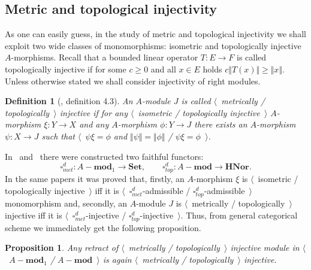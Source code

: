 \documentclass[12pt]{article}
\newtheorem{proposition}[theorem]{Proposition}
\newtheorem{definition}[theorem]{Definition}
\begin{document}

\subsection{Metric and topological
    injectivity}\label{SubSectionMetricAndTopologicalInjectivity}

As one can easily guess, in the study of metric and topological injectivity we
shall exploit two wide classes of monomorphisms: isometric and topologically
injective $A$-morphisms. Recall that a bounded linear operator $T:E\to F$ is
called topologically injective if for some $c\geq 0$ and all $x\in E$ holds
$c\Vert T(x)\Vert\geq \Vert x\Vert$. Unless otherwise stated we shall consider
injectivity of right modules.

\begin{definition}[\cite{HelMetrFrQMod}, definition 4.3]\label{MetTopInjMod} An
    $A$-module $J$ is called $\langle$~metrically / topologically~$\rangle$
    injective if for any $\langle$~isometric / topologically injective~$\rangle$
    $A$-morphism $\xi:Y\to X$ and any $A$-morphism $\phi:Y\to J$ there exists an
    $A$-morphism $\psi:X\to J$ such that $\langle$~$\psi\xi=\phi$  and
    $\Vert\psi\Vert=\Vert\phi\Vert$ / $\psi\xi=\phi$~$\rangle$.
\end{definition}

In~\cite{HelMetrFrQMod} and~\cite{ShtTopFrClassicQuantMod} there were
constructed two faithful functors:
$$
    \square_{met}^d:A-\mathbf{mod}_1\to\mathbf{Set},
    \qquad
    \square_{top}^d:A-\mathbf{mod}\to\mathbf{HNor}.
$$
In the same papers it was proved that, firstly, an $A$-morphism $\xi$ is
$\langle$~isometric / topologically injective~$\rangle$ iff it is
$\langle$~$\square_{met}^d$-admissible / $\square_{top}^d$-admissible~$\rangle$
monomorphism and, secondly, an $A$-module $J$ is $\langle$~metrically /
topologically~$\rangle$ injective iff it is
$\langle$~$\square_{met}^d$-injective / $\square_{top}^d$-injective~$\rangle$.
Thus, from general categorical scheme we immediately get the following
proposition.

\begin{proposition}\label{RetrMetTopInjIsMetTopInj} Any retract of
    $\langle$~metrically / topologically~$\rangle$ injective module in
    $\langle$~$A-\mathbf{mod}_1$ / $A-\mathbf{mod}$~$\rangle$ 
    is again $\langle$~metrically / topologically~$\rangle$ injective.
\end{proposition}
\end{document}
